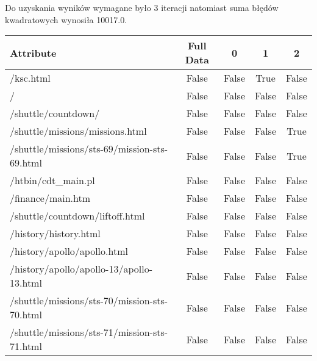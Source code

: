 \documentclass[../EDI_Task1_Karwowski_Kowalewski.tex]{subfiles}
\begin{document}
{{{            Do uzyskania wyników wymagane było 3 iteracji natomiast suma błędów
            kwadratowych wynosiła 10017.0.
            \begin{table}[!htbp]
                \footnotesize
                \centering
                \begin{tabular}{|l|c|c|c|c|}
                    \hline
                    Attribute                                        &  Full Data   &       0   &       1   &       2 \\ \hline
                    /ksc.html                                        &      False   &   False   &    True   &   False \\
                    /                                                &      False   &   False   &   False   &   False \\
                    /shuttle/countdown/                              &      False   &   False   &   False   &   False \\
                    /shuttle/missions/missions.html                  &      False   &   False   &   False   &    True \\
                    /shuttle/missions/sts-69/mission-sts-69.html     &      False   &   False   &   False   &    True \\
                    /htbin/cdt\_main.pl                               &      False   &   False   &   False   &   False \\
                    /finance/main.htm                                &      False   &   False   &   False   &   False \\
                    /shuttle/countdown/liftoff.html                  &      False   &   False   &   False   &   False \\
                    /history/history.html                            &      False   &   False   &   False   &   False \\
                    /history/apollo/apollo.html                      &      False   &   False   &   False   &   False \\
                    /history/apollo/apollo-13/apollo-13.html         &      False   &   False   &   False   &   False \\
                    /shuttle/missions/sts-70/mission-sts-70.html     &      False   &   False   &   False   &   False \\
                    /shuttle/missions/sts-71/mission-sts-71.html     &      False   &   False   &   False   &   False \\

\end{tabular}
\end{table}}}}
\end{document}
